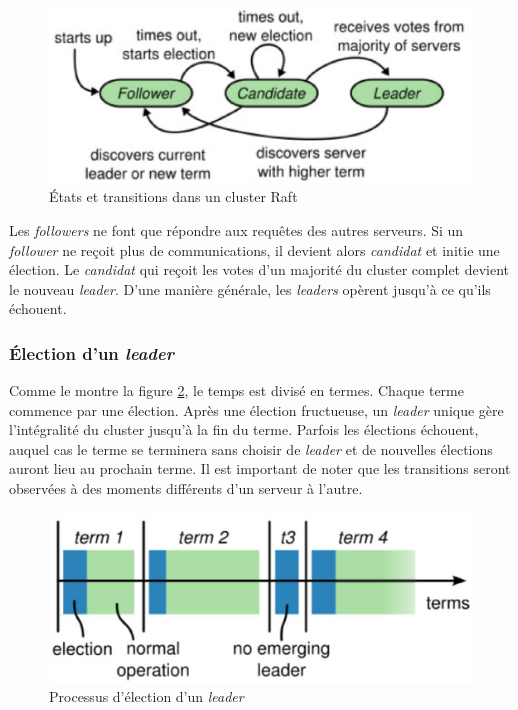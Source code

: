 \begin{figure}[H]
    \centerline{\includegraphics[width=.47\textwidth]{img/raft_server_states}}
    \caption{États et transitions dans un cluster Raft}
    \label{fig:raft_server_states}
\end{figure}

Les \emph{followers} ne font que répondre aux requêtes des autres serveurs. Si
un \emph{follower} ne reçoit plus de communications, il devient alors
\emph{candidat} et initie une élection. Le \emph{candidat} qui reçoit les votes
d'un majorité du cluster complet devient le nouveau \emph{leader}. D'une manière
générale, les \emph{leaders} opèrent jusqu'à ce qu'ils échouent.

\subsubsection{Élection d'un \emph{leader}}

Comme le montre la figure \ref{fig:leader_election}, le temps est divisé en
termes. Chaque terme commence par une élection. Après une élection fructueuse,
un \emph{leader} unique gère l'intégralité du cluster jusqu'à la fin du terme.
Parfois les élections échouent, auquel cas le terme se terminera sans choisir de
\emph{leader} et de nouvelles élections auront lieu au prochain terme. Il est
important de noter que les transitions seront observées à des moments différents
d'un serveur à l'autre.

\begin{figure}[H]
    \centerline{\includegraphics[width=.37\textwidth]{img/leader_election}}
    \caption{Processus d'élection d'un \emph{leader}}
    \label{fig:leader_election}
\end{figure}

